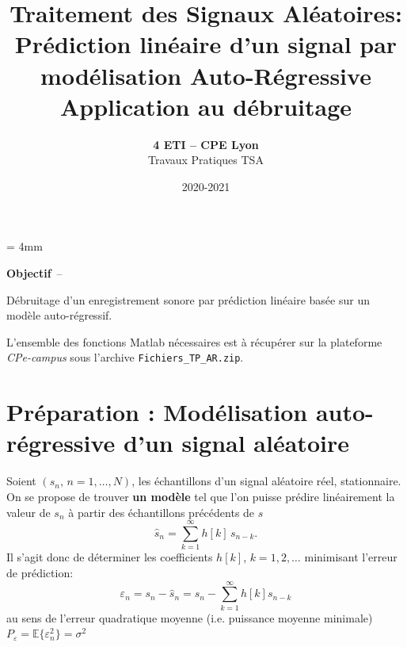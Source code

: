 \documentclass{article}
\begin{document}
\baselineskip = 4mm
\title{Traitement des Signaux Aléatoires: \\
Prédiction linéaire d'un signal par modélisation Auto-Régressive \\
Application au débruitage}

\author{\textbf{4 ETI -- CPE Lyon }\\[3mm]
{Travaux Pratiques TSA}}
\date{2020-2021}

\maketitle

\noindent{}
\vspace*{5mm}



{\Large\bf Objectif}~--~~\begin{minipage}[t]{135mm}
Débruitage d'un enregistrement sonore par prédiction linéaire basée sur un modèle auto-régressif.

\vspace*{4mm}
L'ensemble des fonctions Matlab nécessaires est à récupérer sur la  plateforme {\em CPe-campus} sous l'archive {\tt Fichiers\_TP\_AR.zip}.
\end{minipage}

\vspace*{4mm}
\renewcommand{\thesection}{\Roman{section}}

\section{Préparation : Modélisation auto-régressive d'un signal aléatoire}

Soient $(s_n,\,n=1,\ldots, N)$, les échantillons d'un signal aléatoire réel, stationnaire. On se propose de trouver \textbf{un modèle} tel que l'on puisse prédire linéairement la valeur de $s_n$  à partir des échantillons précédents de $s$
\begin{equation}
\hat{s}_n = \sum_{k=1}^{\infty} h[k]\,s_{n-k}.
\label{eq:AR(M)}\end{equation}
Il s'agit donc de déterminer les coefficients  $h[k]$, $k=1,2,\ldots$  minimisant l'erreur de prédiction:
\begin{equation}
\varepsilon_n = s_n - \hat{s}_n = s_n - \sum_{k=1}^{\infty} h[k] s_{n-k}
\label{eq:erreur}
\end{equation}
au sens de l'erreur quadratique  moyenne (i.e. puissance moyenne minimale) $P_{\varepsilon} = \mathbb{E}\{ \varepsilon^2_n\} = \sigma^2$
\end{document}
